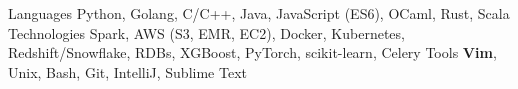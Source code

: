 \begin{cvskills}
  \cvskill
    {Languages}
    {Python, Golang, C/C++, Java, JavaScript (ES6), OCaml, Rust, Scala}
  \cvskill
    {Technologies}
    {Spark, AWS (S3, EMR, EC2), Docker, Kubernetes, Redshift/Snowflake, RDBs, XGBoost, PyTorch, scikit-learn, Celery}
  \cvskill
    {Tools}
    {\textbf{Vim}, Unix, Bash, Git, IntelliJ, Sublime Text}
\end{cvskills}
